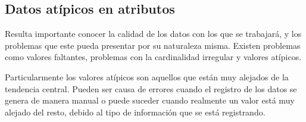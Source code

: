 \subsection{Datos atípicos en atributos}
Resulta importante conocer la calidad de los datos con los que se trabajará, y los problemas que este pueda presentar por su naturaleza misma. Existen problemas como valores faltantes, problemas con la cardinalidad irregular y valores atípicos. \cite{Aceves2021}

Particularmente los valores atípicos son aquellos que están muy alejados de la tendencia central. Pueden ser causa de errores cuando el registro de los datos se genera de manera manual o puede suceder cuando realmente un valor está muy alejado del resto, debido al tipo de información que se está registrando. \cite{Aceves2021}
